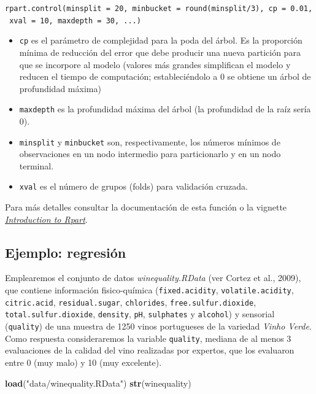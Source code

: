 \documentclass[]{book}
\newenvironment{Shaded}{\begin{snugshade}}{\end{snugshade}}
\newcommand{\KeywordTok}[1]{\textcolor[rgb]{0.13,0.29,0.53}{\textbf{#1}}}
\newcommand{\StringTok}[1]{\textcolor[rgb]{0.31,0.60,0.02}{#1}}
\newcommand{\NormalTok}[1]{#1}
\theoremstyle{break}
\theoremstyle{definition}
\theoremstyle{definition}
\theoremstyle{definition}
\theoremstyle{remark}
\begin{document}
\begin{itemize}
  \texttt{rpart.control(minsplit\ =\ 20,\ minbucket\ =\ round(minsplit/3),\ cp\ =\ 0.01,\ xval\ =\ 10,\ maxdepth\ =\ 30,\ ...)}

  \begin{itemize}
  \item
    \texttt{cp} es el parámetro de complejidad para la poda del árbol.
    Es la proporción mínima de reducción del error que debe producir una
    nueva partición para que se incorpore al modelo (valores más grandes
    simplifican el modelo y reducen el tiempo de computación;
    estableciéndolo a 0 se obtiene un árbol de profundidad máxima)
  \item
    \texttt{maxdepth} es la profundidad máxima del árbol (la profundidad
    de la raíz sería 0).
  \item
    \texttt{minsplit} y \texttt{minbucket} son, respectivamente, los
    números mínimos de observaciones en un nodo intermedio para
    particionarlo y en un nodo terminal.
  \item
    \texttt{xval} es el número de grupos (folds) para validación
    cruzada.
  \end{itemize}
\end{itemize}

Para más detalles consultar la documentación de esta función o la
vignette
\href{https://cran.r-project.org/web/packages/rpart/vignettes/longintro.pdf}{\emph{Introduction
to Rpart}}.

\subsection{Ejemplo: regresión}\label{ejemplo-regresiuxf3n}

Emplearemos el conjunto de datos \emph{winequality.RData} (ver Cortez et
al., 2009), que contiene información fisico-química
(\texttt{fixed.acidity}, \texttt{volatile.acidity},
\texttt{citric.acid}, \texttt{residual.sugar}, \texttt{chlorides},
\texttt{free.sulfur.dioxide}, \texttt{total.sulfur.dioxide},
\texttt{density}, \texttt{pH}, \texttt{sulphates} y \texttt{alcohol}) y
sensorial (\texttt{quality}) de una muestra de 1250 vinos portugueses de
la variedad \emph{Vinho Verde}. Como respuesta consideraremos la
variable \texttt{quality}, mediana de al menos 3 evaluaciones de la
calidad del vino realizadas por expertos, que los evaluaron entre 0 (muy
malo) y 10 (muy excelente).

\begin{Shaded}
\begin{Highlighting}[]
\KeywordTok{load}\NormalTok{(}\StringTok{"data/winequality.RData"}\NormalTok{)}
\KeywordTok{str}\NormalTok{(winequality)}
\end{Highlighting}
\end{Shaded}
\end{document}
